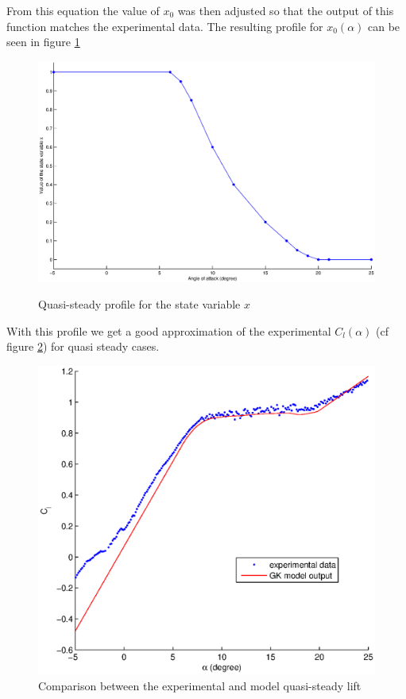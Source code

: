 \par From this equation the value of $x_0$ was then adjusted so that the output of this function matches the experimental data. 
The resulting profile for $x_0(\alpha)$ can be seen in figure \ref{fig:x_0_vs_alpha}

\begin{figure}[h]
  \begin{center}
    \scalebox{0.5}
    {\includegraphics{./Figures/x_0_vs_alpha.eps}}
  \end{center}
  \caption{Quasi-steady profile for the state variable $x$}
  \label{fig:x_0_vs_alpha}
\end{figure}

With this profile we get a good approximation of the experimental $C_l(\alpha)$ (cf figure \ref{fig:GK_Cl_vs_alpha}) for quasi steady cases.

\begin{figure}[h]
  \begin{center}
    \includegraphics{./Figures/GK_cl_vs_alpha.eps}
  \end{center}
  \caption{Comparison between the experimental and model quasi-steady lift}
  \label{fig:GK_Cl_vs_alpha}
\end{figure}

